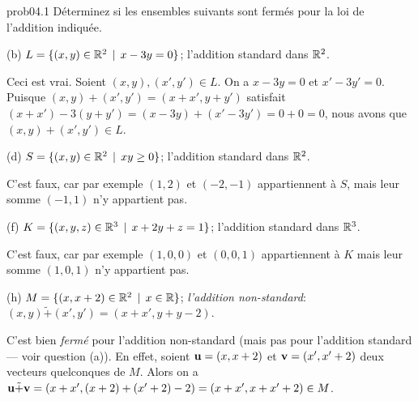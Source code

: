 \begin{sol}{prob04.1}  Déterminez si les
ensembles suivants sont fermés pour la loi de l'addition indiquée.

\medskip
(b) $L=\{(x, y) \in \mathbb{R}^2\, \mid \, x -3y=0 \}$; l'addition standard dans $\mathbb{R}^2$.


\soln Ceci est vrai. Soient $(x,y), (x',y')\in L$. On a
$x -3y=0$ et $x' -3y'=0$. Puisque $(x,y)+ (x',y')=(x+x', y+y')$
satisfait $(x+x') -3(y+y')= (x -3y) +(x' -3y')=0+0=0$, nous avons que
$(x,y)+ (x',y')\in L$.  

\medskip
(d) $S=\{(x, y) \in \mathbb{R}^2\, \mid \, xy \ge 0 \}$; l'addition standard dans $\mathbb{R}^2$.

\soln C'est faux, car par exemple $(1,2)$ et
$(-2,-1)$ appartiennent à $S$, mais leur somme $(-1,1)$
n'y appartient pas.  

\medskip
(f) $K=\{(x, y, z) \in \mathbb{R}^3\, \mid \, x+2y+z=1 \}$; l'addition standard dans $\mathbb{R}^3$. 

\soln C'est faux, car par exemple
$(1,0,0)$ et $(0,0,1)$ appartiennent à $K$ mais leur somme
$(1,0,1)$ n'y appartient pas.  

\medskip
(h) $M=\{(x, x+2) \in \mathbb{R}^2\, \mid \, x\in \mathbb{R}\}$; {\emph{l'addition non-standard}}: $(x,y) \tilde+ (x',y')=(x+x', y+y-2)$.

\soln C'est bien {\it fermé} pour l'addition non-standard (mais pas pour
l'addition standard --- voir question (a)). En effet, soient $\mathbf{u}=(x, x+2)$ et
$\mathbf{v}=(x', x'+2)$ deux vecteurs quelconques de $M$. Alors on a
$\mathbf{u} \tilde+ \mathbf{v}=(x+x', (x+2)+(x'+2)-2)=(x+x', x+x'+2) \in M$.
\end{sol}
\medskip
 

